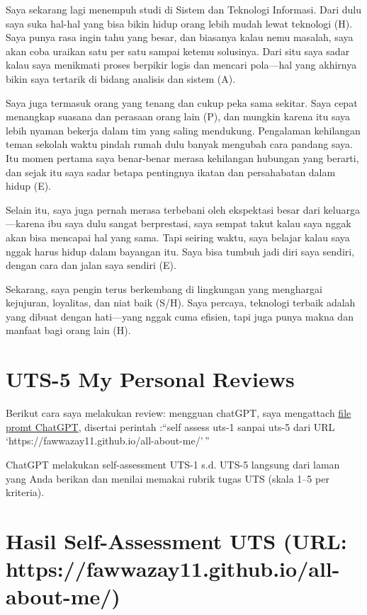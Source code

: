 \documentclass[
  letterpaper,
  DIV=11,
  numbers=noendperiod]{scrreprt}
\begin{document}
Saya sekarang lagi menempuh studi di Sistem dan Teknologi Informasi.
Dari dulu saya suka hal-hal yang bisa bikin hidup orang lebih mudah
lewat teknologi (H). Saya punya rasa ingin tahu yang besar, dan biasanya
kalau nemu masalah, saya akan coba uraikan satu per satu sampai ketemu
solusinya. Dari situ saya sadar kalau saya menikmati proses berpikir
logis dan mencari pola---hal yang akhirnya bikin saya tertarik di bidang
analisis dan sistem (A).

Saya juga termasuk orang yang tenang dan cukup peka sama sekitar. Saya
cepat menangkap suasana dan perasaan orang lain (P), dan mungkin karena
itu saya lebih nyaman bekerja dalam tim yang saling mendukung.
Pengalaman kehilangan teman sekolah waktu pindah rumah dulu banyak
mengubah cara pandang saya. Itu momen pertama saya benar-benar merasa
kehilangan hubungan yang berarti, dan sejak itu saya sadar betapa
pentingnya ikatan dan persahabatan dalam hidup (E).

Selain itu, saya juga pernah merasa terbebani oleh ekspektasi besar dari
keluarga---karena ibu saya dulu sangat berprestasi, saya sempat takut
kalau saya nggak akan bisa mencapai hal yang sama. Tapi seiring waktu,
saya belajar kalau saya nggak harus hidup dalam bayangan itu. Saya bisa
tumbuh jadi diri saya sendiri, dengan cara dan jalan saya sendiri (E).

Sekarang, saya pengin terus berkembang di lingkungan yang menghargai
kejujuran, loyalitas, dan niat baik (S/H). Saya percaya, teknologi
terbaik adalah yang dibuat dengan hati---yang nggak cuma efisien, tapi
juga punya makna dan manfaat bagi orang lain (H).


\chapter{UTS-5 My Personal Reviews}\label{uts-5-my-personal-reviews}

Berikut cara saya melakukan review: mengguan chatGPT, saya mengattach
\href{skor_uts.pdf}{file promt ChatGPT}, disertai perintah :``self
assess uts-1 sanpai uts-5 dari URL
`https://fawwazay11.github.io/all-about-me/'\,''

ChatGPT melakukan self-assessment UTS-1 s.d. UTS-5 langsung dari laman
yang Anda berikan dan menilai memakai rubrik tugas UTS (skala 1--5 per
kriteria).


\chapter{Hasil Self-Assessment UTS (URL:
https://fawwazay11.github.io/all-about-me/)}\label{hasil-self-assessment-uts-url-httpsfawwazay11.github.ioall-about-me}
\end{document}
